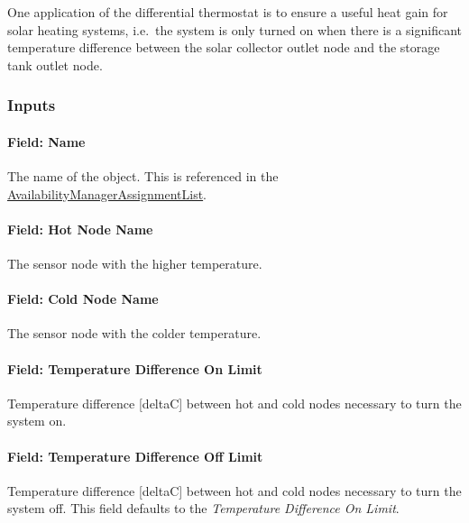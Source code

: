 One application of the differential thermostat is to ensure a useful heat gain for solar heating systems, i.e.~the system is only turned on when there is a significant temperature difference between the solar collector outlet node and the storage tank outlet node.

\subsubsection{Inputs}\label{inputs-4-034}

\paragraph{Field: Name}\label{field-name-3-032}

The name of the object. This is referenced in the \hyperref[availabilitymanagerassignmentlist]{AvailabilityManagerAssignmentList}.

\paragraph{Field: Hot Node Name}\label{field-hot-node-name}

The sensor node with the higher temperature.

\paragraph{Field: Cold Node Name}\label{field-cold-node-name}

The sensor node with the colder temperature.

\paragraph{Field: Temperature Difference On Limit}\label{field-temperature-difference-on-limit}

Temperature difference {[}deltaC{]} between hot and cold nodes necessary to turn the system on.

\paragraph{Field: Temperature Difference Off Limit}\label{field-temperature-difference-off-limit}

Temperature difference {[}deltaC{]} between hot and cold nodes necessary to turn the system off. This field defaults to the \emph{Temperature Difference On Limit}.

